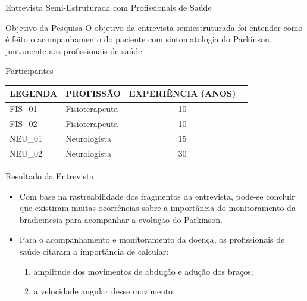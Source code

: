 \documentclass{beamer}
\begin{document}
\begin{frame}{Entrevista Semi-Estruturada com Profissionais de Saúde} 
    \begin{block}{Objetivo da Pesquisa}
    O objetivo da entrevista semiestruturada foi entender como é feito o acompanhamento do paciente com sintomatologia do Parkinson, juntamente aos profissionais de saúde.
    \end{block}
		\begin{block}{Participantes}
			\begin{table}[h]
			\begin{tabular}{|l|l|c|c|}
			\hline
			\textbf{LEGENDA} & \textbf{PROFISSÃO}             & \multicolumn{1}{|l|}{\textbf{EXPERIÊNCIA (ANOS)}} \\ \hline
			FIS\_01          & Fisioterapeuta & 10                                                \\ \hline
			FIS\_02          & Fisioterapeuta    & 10                                                \\ \hline
			NEU\_01          & Neurologista            & 15                                                \\ \hline
			NEU\_02          & Neurologista            & 30                                                \\ \hline
			\end{tabular}
			\end{table}
    \end{block}
\end{frame} 

\begin{frame}{Resultado da Entrevista} 
    \begin{block}{}
			\begin{itemize}[<+->]
				\item Com base na rastreabilidade dos fragmentos da entrevista, pode-se concluir que existiram muitas ocorrências sobre a importância do monitoramento da bradicinesia para acompanhar a evolução do Parkinson.
				\item Para o acompanhamento e monitoramento da doença, os profissionais de saúde citaram a importância de calcular:
					\begin{enumerate}
						\item amplitude dos movimentos de abdução e adução dos braços;
						\item a velocidade angular desse movimento.
					\end{enumerate}
			\end{itemize}
    \end{block}
\end{frame} 
\end{document}
